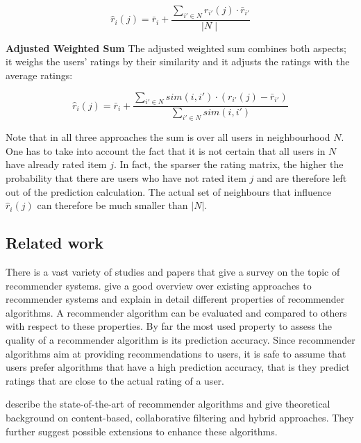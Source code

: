 \begin{equation}
\hat{r}_i(j) = \bar{r}_i + \frac{\sum_{i' \in N}{r_{i'}(j)\cdot \bar{r}_{i'}}}{\mid N\mid}
\label{eq:adjustedsum}
\end{equation}
\newline

\textbf{Adjusted Weighted Sum} The adjusted weighted sum combines both aspects; it weighs the users' ratings by their similarity and it adjusts the ratings with the average ratings:

\begin{equation}
\hat{r}_i(j) =  \bar{r}_i + \frac{\sum_{i' \in N}{sim(i,i')\cdot (r_{i'}(j) - \bar{r}_{i'})}}{\sum_{i' \in N}{sim(i,i')}}
\label{eq:adjustedweightedsum}
\end{equation}

Note that in all three approaches the sum is over all users in neighbourhood $N$. One has to take into account the fact that it is not certain that all users in $N$ have already rated item $j$. In fact, the sparser the rating matrix, the higher the probability that there are users who have not rated item $j$ and are therefore left out of the prediction calculation. The actual set of neighbours that influence $\hat{r}_i(j)$ can therefore be much smaller than $\lvert N \rvert$.

\subsection{Related work}
\label{sst:rsrelatedwork} There is a vast variety of studies and papers that give a survey on the topic of recommender systems. \cite{Ricci_2011} give a good overview over existing approaches to recommender systems and explain in detail different properties of recommender algorithms. A recommender algorithm can be evaluated and compared to others with respect to these properties. By far the most used property to assess the quality of a recommender algorithm is its prediction accuracy. Since recommender algorithms aim at providing recommendations to users, it is safe to assume that users prefer algorithms that have a high prediction accuracy, that is they predict ratings that are close to the actual rating of a user.

\cite{Adomavicius_2005} describe the state-of-the-art of recommender algorithms and give theoretical background on content-based, collaborative filtering and hybrid approaches. They further suggest possible extensions to enhance these algorithms.

